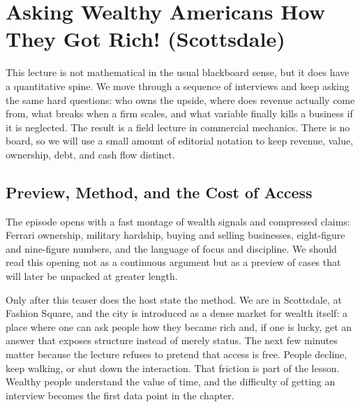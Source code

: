 \chapter{Asking Wealthy Americans How They Got Rich! (Scottsdale)}

This lecture is not mathematical in the usual blackboard sense, but it does have a quantitative spine. We move through a sequence of interviews and keep asking the same hard questions: who owns the upside, where does revenue actually come from, what breaks when a firm scales, and what variable finally kills a business if it is neglected. The result is a field lecture in commercial mechanics. There is no board, so we will use a small amount of editorial notation to keep revenue, value, ownership, debt, and cash flow distinct.

\section{Preview, Method, and the Cost of Access}

The episode opens with a fast montage of wealth signals and compressed claims: Ferrari ownership, military hardship, buying and selling businesses, eight-figure and nine-figure numbers, and the language of focus and discipline. We should read this opening not as a continuous argument but as a preview of cases that will later be unpacked at greater length.

Only after this teaser does the host state the method. We are in Scottsdale, at Fashion Square, and the city is introduced as a dense market for wealth itself: a place where one can ask people how they became rich and, if one is lucky, get an answer that exposes structure instead of merely status. The next few minutes matter because the lecture refuses to pretend that access is free. People decline, keep walking, or shut down the interaction. That friction is part of the lesson. Wealthy people understand the value of time, and the difficulty of getting an interview becomes the first data point in the chapter.

